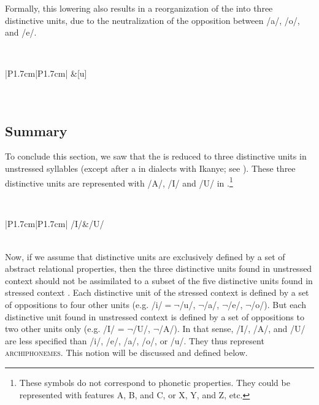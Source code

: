 \documentclass[output=paper,modfonts,newtxmath,hidelinks,]{langscibook}
\begin{document}
\noindent Formally, this lowering also results in a reorganization of the  into three distinctive units, due to the neutralization of the opposition between /a/, /o/, and /e/.

\label{5:16}\\\medskip
\begin{tabular}{|P{1.7cm}|P{1.7cm}|}
\hline
[i]&[u]\\\hline
{}\\
\\\hline
\end{tabular}
\z


\subsection{Summary}\label{5:s2.4}

To conclude this section, we saw that the   is reduced to three distinctive units in unstressed syllables (except after a  in dialects with Ikanye; see ). These three distinctive units are represented with /A/, /I/ and /U/ in .\footnote{These symbols do not correspond to phonetic properties. They could be represented with features {\textbar}A{\textbar}, {\textbar}B{\textbar}, and {\textbar}C{\textbar}, or {\textbar}X{\textbar}, {\textbar}Y{\textbar}, and {\textbar}Z{\textbar}, etc.}

\label{5:17}\\\medskip
\begin{tabular}{|P{1.7cm}|P{1.7cm}|}
\hline
/I/&/U/\\\hline
{}\\\hline
\end{tabular}
\z

\noindent Now, if we assume that distinctive units are exclusively defined by a set of abstract relational properties, then the three distinctive units found in unstressed context  should not be assimilated to a subset of the five distinctive units found in stressed context . Each distinctive unit of the stressed context is defined by a set of oppositions to four other units (e.g. /i/${}=\neg{}$/u/, $\neg$/a/, $\neg$/e/, $\neg$/o/). But each distinctive unit found in unstressed context  is defined by a set of oppositions to two other units only (e.g. /I/ = $\neg$/U/, $\neg$/A/). In that sense, /I/, /A/, and /U/ are less specified than /i/, /e/, /a/, /o/, or /u/. They thus represent \textsc{archiphonemes}. This notion will be discussed and defined below.
\end{document}
